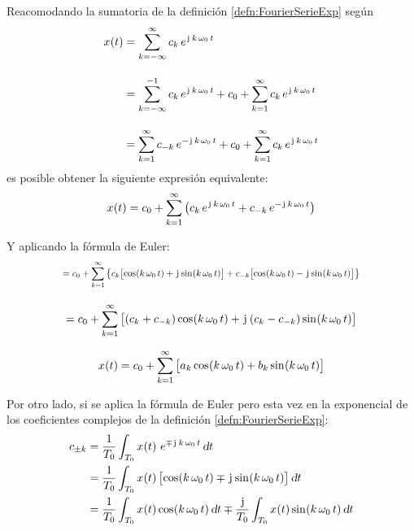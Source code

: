 Reacomodando la sumatoria de la definición \ref{defn:FourierSerieExp} según
\begin{align*}
    \fx[x]{t} &=
    \sum_{\kth=-\infty}^\infty c_\kth \, e^{\iu \, \kth \, \omega_0 \, t}
    \\[1em]
    &= \sum_{\kth=-\infty}^{-1} c_\kth \, e^{\iu \, \kth \, \omega_0 \, t} + c_0 + \sum_{\kth=1}^{\infty} c_\kth \, e^{\iu \, \kth \, \omega_0 \, t}
    \\[1em]
    &= \sum_{\kth=1}^{\infty} c_{-\kth} \, e^{-\iu \, \kth \, \omega_0 \, t} + c_0 + \sum_{\kth=1}^{\infty} c_\kth \, e^{\iu \, \kth \, \omega_0 \, t}
\end{align*}
es posible obtener la siguiente expresión equivalente:
\begin{equation}
    \fx[x]{t} = c_0 + \sum_{\kth=1}^{\infty} \inParentheses{ c_\kth \, e^{\iu \, \kth \, \omega_0 \, t} + c_{-\kth} \, e^{-\iu \, \kth \, \omega_0 \, t} }
    \label{eqn:FourierExpBis}
\end{equation}

Y aplicando la fórmula de Euler:
\begin{align*}
    &
    \scale{0.80}{
    = c_0 + \sum_{\kth=1}^{\infty} \inBraces{c_\kth \inBrackets{\fx[\cos]{\kth \, \omega_0 \, t} + \iu \fx[\sin]{\kth \, \omega_0 \, t}} + c_{-\kth} \inBrackets{\fx[\cos]{\kth \, \omega_0 \, t} - \iu \fx[\sin]{\kth \, \omega_0 \, t}} }
    }
    \\[1em]
    &= c_0 + \sum_{\kth=1}^{\infty} \inBrackets{ \inParentheses{c_\kth + c_{-\kth}} \fx[\cos]{\kth \, \omega_0 \, t} + \iu \inParentheses{c_\kth - c_{-\kth}} \fx[\sin]{\kth \, \omega_0 \, t} }
\end{align*}

\begin{mdframed}[style=DefinitionFrame]
    \begin{defn}
        \label{defn:FourierSerieTrig}
    \end{defn}
    \[
        \fx[x]{t} = c_0 + \sum_{\kth=1}^{\infty} \inBrackets{a_\kth \fx[\cos]{\kth \, \omega_0 \, t} + b_\kth \fx[\sin]{\kth \, \omega_0 \, t} }
    \]
\end{mdframed}

Por otro lado, si se aplica la fórmula de Euler pero esta vez en la exponencial de los coeficientes complejos de la definición \ref{defn:FourierSerieExp}:
\begin{align*}
    c_{\pm\kth} &= \frac{1}{T_0} \int_{T_0} \fx[x]{t} \, e^{\mp \iu \, \kth \, \omega_0 \, t} \, \dif t
    \\
    &= \frac{1}{T_0} \int_{T_0} \fx[x]{t} \inBrackets{ \fx[\cos]{\kth \, \omega_0 \, t} \mp \iu \fx[\sin]{\kth \, \omega_0 \, t} } \, \dif t
    \\
    &= \frac{1}{T_0} \int_{T_0} \fx[x]{t} \fx[\cos]{\kth \, \omega_0 \, t} \dif t
    \mp \frac{\iu}{T_0} \int_{T_0} \fx[x]{t} \fx[\sin]{\kth \, \omega_0 \, t} \dif t
\end{align*}

